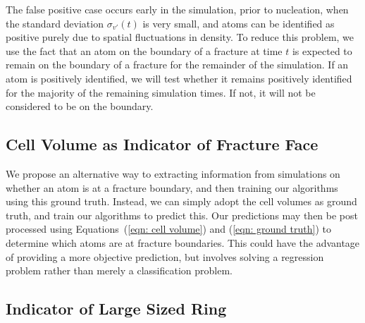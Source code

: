 The false positive case occurs early in the simulation, prior to nucleation, when the standard deviation $\sigma_{v'}(t)$ is very small, and atoms can be identified as positive purely due to spatial fluctuations in density.  To reduce this problem, we use the fact that an atom on the boundary of a fracture at time $t$ is expected to remain on the boundary of a fracture for the remainder of the simulation.  If an atom is positively identified, we will test whether it remains positively identified for the majority of the remaining simulation times.  If not, it will not be considered to be on the boundary.

\subsection{Cell Volume as Indicator of Fracture Face}

We propose an alternative way to extracting information from simulations on whether an atom is at a fracture boundary, and then training our algorithms using this ground truth.  Instead, we can simply adopt the cell volumes as ground truth, and train our algorithms to predict this.  Our predictions may then be post processed using Equations~(\ref{eqn: cell volume}) and (\ref{eqn: ground truth}) to determine which atoms are at fracture boundaries.  This could have the advantage of providing a more objective prediction, but involves solving a regression problem rather than merely a classification problem.

\subsection{Indicator of Large Sized Ring}

